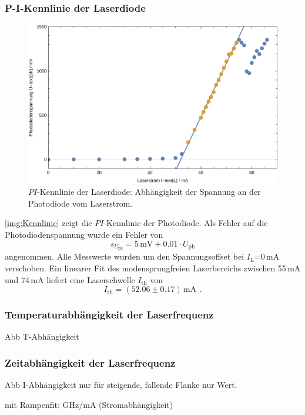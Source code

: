 \subsubsection*{P-I-Kennlinie der Laserdiode}
\begin{figure}[H]
\begin{center}
  \includegraphics[width=\textwidth]{../img/part1/Kennlinie.pdf}
  \caption{$PI$-Kennlinie der Laserdiode: Abhängigkeit der Spannung
  an der Photodiode vom Laserstrom.}
  \label{img:Kennlinie}
\end{center}
\end{figure} 
\autoref{img:Kennlinie} zeigt die $PI$-Kennlinie der Photodiode.
Als Fehler auf die Photodiodenspannung wurde ein Fehler von
\begin{equation}
  s_{U_{\text{ph}}}= 5\,\text{mV} + 0.01 \cdot U_{\text{ph}}
\end{equation}
angenommen.
Alle Messwerte wurden um den Spannungsoffset bei $I_{\text{L}}$=0\,mA verschoben.
Ein linearer Fit des modensprungfreien Laserbereichs zwischen 55\,mA und 74\,mA
liefert eine Laserschwelle $I_{\text{th}}$ von
\begin{equation}
  I_{\text{th}}=(52.06\pm0.17)\,\text{mA} \ \, .
\end{equation}

\subsubsection*{Temperaturabhängigkeit der Laserfrequenz}
Abb T-Abhängigkeit

\subsubsection*{Zeitabhängigkeit der Laserfrequenz} 

Abb I-Abhängigkeit nur für steigende,
fallende Flanke nur Wert.

mit Rampenfit: GHz/mA (Stromabhängigkeit)